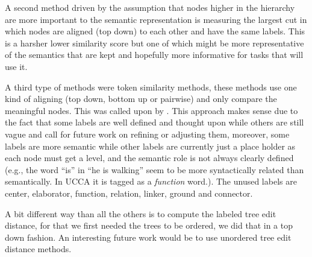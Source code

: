 \documentclass[letter,11pt]{article}
\begin{document}
{A second method driven by the assumption that nodes higher in the
hierarchy are more important to the semantic representation is measuring
the largest cut in which nodes are aligned (top down) to each other
and have the same labels. This is a harsher lower similarity
score but one of which might be more representative of the semantics
that are kept and hopefully more informative for tasks that will use it.

A third type of methods were token similarity methods, these methods
use one kind of aligning (top down, bottom up or pairwise) and only
compare the meaningful nodes. This was called upon by \cite{sulem2015conceptual}. 
This approach makes sense due to the fact that some labels
are well defined and thought upon while others are still vague and
call for future work on refining or adjusting them, moreover, some
labels are more semantic while other labels are currently just a place
holder as each node must get a level, and the semantic role is not
always clearly defined (e.g., the word ``is'' in ``he is walking''
seem to be more syntactically related than semantically. In UCCA it is tagged as a \textit{function} word.). The unused
labels are center, elaborator, function, relation, linker, ground
and connector.

A bit different way than all the others is to compute the labeled
tree edit distance\cite{zhang1989simple}, for that we first needed
the trees to be ordered, we did that in a top down fashion. An interesting
future work would be to use unordered tree edit distance methods\cite{zhang1992editing}.


}
\end{document}
